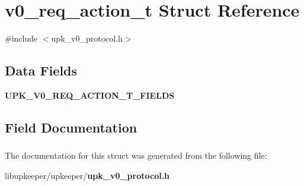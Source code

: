 \section{v0\_\-req\_\-action\_\-t Struct Reference}
\label{structv0__req__action__t}


{\ttfamily \#include $<$upk\_\-v0\_\-protocol.h$>$}

\subsection*{Data Fields}
\begin{DoxyCompactItemize}
\item 
{\bf UPK\_\-V0\_\-REQ\_\-ACTION\_\-T\_\-FIELDS}
\end{DoxyCompactItemize}


\subsection{Field Documentation}
\subsubsection[{UPK\_\-V0\_\-REQ\_\-ACTION\_\-T\_\-FIELDS}]{}\label{structv0__req__action__t_aaad19b60b6f16c89134e934bfbc953f0}


The documentation for this struct was generated from the following file:\begin{DoxyCompactItemize}
\item 
libupkeeper/upkeeper/{\bf upk\_\-v0\_\-protocol.h}\end{DoxyCompactItemize}
